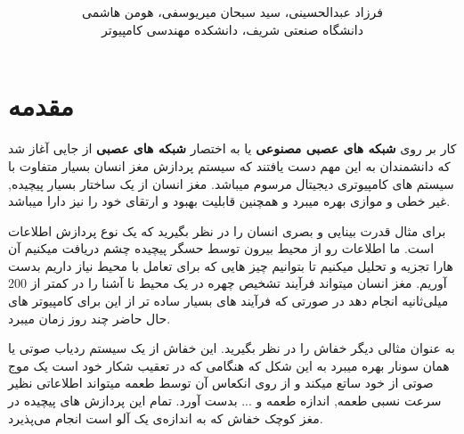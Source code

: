 \documentclass[11pt,a4paper,twocolumn]{article}
\begin{document}
\title{
}
\author{فرزاد عبدالحسینی، سید سبحان میریوسفی، هومن هاشمی\\
دانشگاه صنعتی شریف، دانشکده مهندسی کامپیوتر\\
}
\thispagestyle{empty}
\pagestyle{empty}
\section{مقدمه}
کار بر روی
\textbf{شبکه های عصبی مصنوعی}
یا به اختصار
\textbf{شبکه های عصبی}
از جایی آغاز شد که دانشمندان به این مهم دست یافتند که سیستم پردازش مغز انسان بسیار متفاوت با سیستم های کامپیوتری دیجیتال مرسوم میباشد. مغز انسان از یک ساختار بسیار پیچیده, غیر خطی و موازی بهره میبرد و همچنین قابلیت بهبود و ارتقای خود را نیز دارا میباشد.

برای مثال قدرت بینایی و بصری انسان را در نظر بگیرید که یک نوع پردازش اطلاعات است. ما اطلاعات رو از محیط بیرون توسط حسگر پیچیده چشم دریافت میکنیم آن هارا تجزیه و تحلیل میکنیم تا بتوانیم چیز هایی که برای تعامل با محیط نیاز داریم بدست آوریم. مغز انسان میتواند فرآیند تشخیص چهره در یک محیط نا آشنا را در کمتر از 200 میلی‌ثانیه انجام دهد در صورتی که فرآیند های بسیار ساده تر از این برای کامپیوتر های حال حاضر چند روز زمان میبرد.

به عنوان مثالی دیگر خفاش را در نظر بگیرید. این خفاش از یک سیستم ردیاب صوتی یا همان سونار بهره میبرد به این شکل که هنگامی که در تعقیب شکار خود است یک موج صوتی از خود ساتع میکند و از روی انکعاس آن توسط طعمه میتواند اطلاعاتی نظیر  سرعت نسبی طعمه, اندازه طعمه و ... بدست آورد. تمام این پردازش های پیچیده در مغز کوچک خفاش که به اندازه‌‌ی یک آلو است انجام می‌پذیرد.
\end{document}
